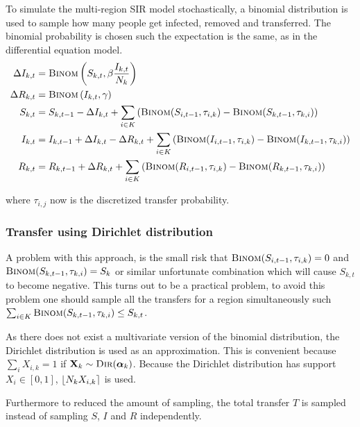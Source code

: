 To simulate the multi-region SIR model stochastically, a binomial distribution is used to sample how many people get infected, removed and transferred. The binomial probability is chosen such the expectation is the same, as in the differential equation model.
\begin{equation*}
\begin{aligned}
\Delta I_{k,t} &= \textsc{Binom}\left(S_{k,t}, \beta \frac{I_{k, t}}{N_k}\right) \\
\Delta R_{k,t} &= \textsc{Binom}\left(I_{k,t}, \gamma\right) \\
S_{k,t} &= S_{k,t-1} - \Delta I_{k,t} + \sum_{i \in K} \left(\textsc{Binom}(S_{i,t-1}, \tau_{i,k}) - \textsc{Binom}(S_{k,t-1}, \tau_{k,i})\right) \\
I_{k,t} &= I_{k,t-1} + \Delta I_{k,t} - \Delta R_{k, t} + \sum_{i \in K} \left(\textsc{Binom}(I_{i,t-1}, \tau_{i,k}) - \textsc{Binom}(I_{k,t-1}, \tau_{k,i})\right) \\
R_{k,t} &= R_{k,t-1} + \Delta R_{k, t} + \sum_{i \in K} \left(\textsc{Binom}(R_{i,t-1}, \tau_{i,k}) - \textsc{Binom}(R_{k,t-1}, \tau_{k,i})\right)
\end{aligned}
\end{equation*}

where $\tau_{i,j}$ now is the discretized transfer probability.

\subsubsection{Transfer using Dirichlet distribution}
A problem with this approach, is the small risk that $\textsc{Binom}(S_{i, t-1}, \tau_{i,k}) = 0$ and $\textsc{Binom}(S_{k, t-1}, \tau_{k,i}) = S_k$ or similar unfortunate combination which will cause $S_{k,t}$ to become negative. This turns out to be a practical problem, to avoid this problem one should sample all the transfers for a region simultaneously such $\sum_{i \in K} \textsc{Binom}(S_{k,t-1}, \tau_{k,i}) \le S_{k, t}$.

As there does not exist a multivariate version of the binomial distribution, the Dirichlet distribution is used as an approximation. This is convenient because $\sum_{i} X_{i,k} = 1$ if $\mathbf{X}_k \sim \textsc{Dir}(\boldsymbol{\alpha}_k)$. Because the Dirichlet distribution has support $X_i \in [0, 1]$, $\iround*{N_k X_{i,k}}$ is used.

Furthermore to reduced the amount of sampling, the total transfer $T$ is sampled instead of sampling $S$, $I$ and $R$ independently.

